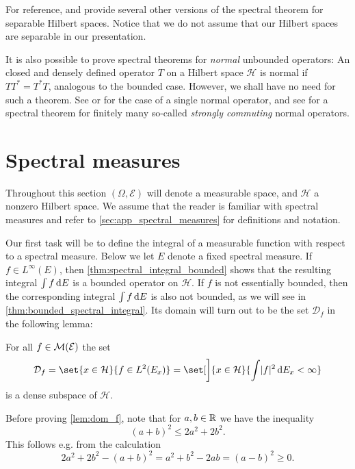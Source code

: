 \documentclass[article, a4paper, 11pt, oneside]{memoir}
\numberwithin{equation}{chapter}
\newcommand{\calH}{\mathcal{H}}
\newcommand{\calE}{\mathcal{E}}
\newcommand{\dom}{\mathcal{D}}
\theoremstyle{myexample}
\theoremstyle{myexample}
\theoremstyle{myexamplebreak}
\theoremstyle{myexamplebreak}
\theoremstyle{nonumberplain}
\theoremstyle{MyNonumberplain}
\begin{document}
For reference, \textcite{reedsimon1} and \textcite{hall2013} provide several other versions of the spectral theorem for separable Hilbert spaces. Notice that we do not assume that our Hilbert spaces are separable in our presentation.

It is also possible to prove spectral theorems for \emph{normal} unbounded operators: An closed and densely defined operator $T$ on a Hilbert space $\calH$ is normal if $TT^* = T^*T$, analogous to the bounded case. However, we shall have no need for such a theorem. See \textcite[Theorem~13.33]{rudinfunctional} or \textcite[Theorem~4.11]{conway1990} for the case of a single normal operator, and see \textcite[Theorem~5.21]{schmudgen2012} for a spectral theorem for finitely many so-called \emph{strongly commuting} normal operators.


\section{Spectral measures}
\label{sec:spectral_measures}

Throughout this section $(\Omega, \calE)$ will denote a measurable space, and $\calH$ a nonzero Hilbert space. We assume that the reader is familiar with spectral measures and refer to \cref{sec:app_spectral_measures} for definitions and notation.

Our first task will be to define the integral of a measurable function with respect to a spectral measure. Below we let $E$ denote a fixed spectral measure. If $f \in L^\infty(E)$, then \cref{thm:spectral_integral_bounded} shows that the resulting integral $\int f \mathop{}\!\mathrm{d} E$ is a bounded operator on $\calH$. If $f$ is not essentially bounded, then the corresponding integral $\int f \mathop{}\!\mathrm{d} E$ is also not bounded, as we will see in \cref{thm:bounded_spectral_integral}. Its domain will turn out to be the set $\dom_f$ in the following lemma:

\begin{lemma}
    \label{lem:dom_f}
    For all $f \in \measurable(\calE)$ the set
    \begin{equation}
        \label{eq:dom_f_definition}
        \dom_f
            = \set{x \in \calH}{ f \in L^2(E_x)}
            = \set[\bigg]{x \in \calH}{ \int \abs{f}^2 \dif E_x < \infty }
    \end{equation}
    is a dense subspace of $\calH$.
\end{lemma}
%
Before proving \cref{lem:dom_f}, note that for $a, b \in \mathbb{R}$ we have the inequality
%
\begin{equation}
    \label{eq:sq_inequality}
    (a + b)^2 \leq 2a^2 + 2b^2.
\end{equation}
%
This follows e.g. from the calculation
%
\begin{equation*}
    2a^2 + 2b^2 - (a+b)^2 = a^2 + b^2 - 2ab = (a-b)^2 \geq 0.
\end{equation*}
\end{document}
